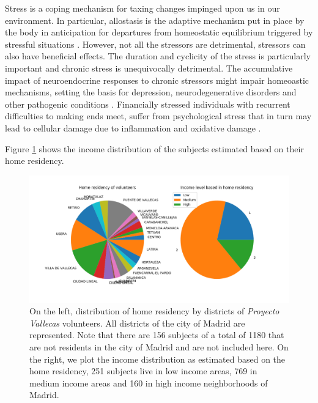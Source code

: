 \documentclass[11pt]{article}
\theoremstyle{definition}
\theoremstyle{remark}
\begin{document}
Stress is a coping mechanism for taxing changes impinged upon us in our environment. In particular, allostasis is the adaptive mechanism put in place by the body in anticipation for departures from homeostatic equilibrium triggered by stressful situations \cite{ellis2014beyond}. However, not all the stressors are detrimental, stressors can also have beneficial effects. 
The duration and cyclicity of the stress is particularly important and chronic stress is unequivocally detrimental. The accumulative impact of neuroendocrine responses to chronic stressors might impair homeoastic mechanisms, setting the basis for depression, neurodegenerative disorders and other pathogenic conditions \cite{bisht2018chronic}. Financially stressed individuals with recurrent difficulties to making ends meet, suffer from psychological stress that in turn may lead to cellular damage due to inflammation and oxidative damage \cite{hayashi2015conversion}. 

Figure \ref{fig:incomeresidency} shows the income distribution of the subjects estimated based on their home residency. 


\begin{figure}[H]
        \centering
        \includegraphics[keepaspectratio, width=.8\linewidth]{figures/incomeresidency}
        \caption{On the left, distribution of home residency by districts of \emph{Proyecto Vallecas} volunteers. All districts of the city of Madrid are represented. Note that there are 156 subjects of a total of 1180 that are not residents in the city of Madrid and are not included here. On the right, we plot the income distribution as estimated based on the home residency, 251 subjects live in low income areas, 769 in medium income areas and 160 in high income neighborhoods of Madrid.
        } \label{fig:incomeresidency}
\end{figure}
\end{document}
